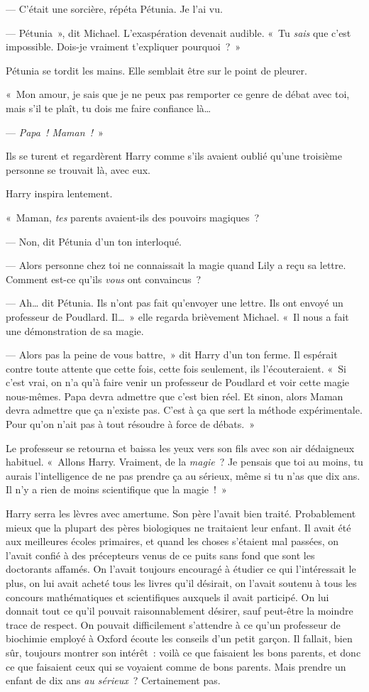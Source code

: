 --- C'était une sorcière, répéta Pétunia. Je l'ai vu.

--- Pétunia~», dit Michael. L'exaspération devenait audible. «~Tu \emph{sais} que c'est impossible. Dois-je vraiment t'expliquer pourquoi~?~»

Pétunia se tordit les mains. Elle semblait être sur le point de pleurer.

«~Mon amour, je sais que je ne peux pas remporter ce genre de débat avec toi, mais s'il te plaît, tu dois me faire confiance là…

--- \emph{Papa~! Maman~!}~»

Ils se turent et regardèrent Harry comme s'ils avaient oublié qu'une troisième personne se trouvait là, avec eux.

Harry inspira lentement.

«~Maman, \emph{tes} parents avaient-ils des pouvoirs magiques~?

--- Non, dit Pétunia d'un ton interloqué.

--- Alors personne chez toi ne connaissait la magie quand Lily a reçu sa lettre. Comment est-ce qu'ils \emph{vous} ont convaincus~?

--- Ah… dit Pétunia. Ils n'ont pas fait qu'envoyer une lettre. Ils ont envoyé un professeur de Poudlard. Il…~» elle regarda brièvement Michael. «~Il nous a fait une démonstration de sa magie.

--- Alors pas la peine de vous battre,~» dit Harry d'un ton ferme. Il espérait contre toute attente que cette fois, cette fois seulement, ils l'écouteraient. «~Si c'est vrai, on n'a qu'à faire venir un professeur de Poudlard et voir cette magie nous-mêmes. Papa devra admettre que c'est bien réel. Et sinon, alors Maman devra admettre que ça n'existe pas. C'est à ça que sert la méthode expérimentale. Pour qu'on n'ait pas à tout résoudre à force de débats.~»

Le professeur se retourna et baissa les yeux vers son fils avec son air dédaigneux habituel. «~Allons Harry. Vraiment, de la \emph{magie}~? Je pensais que toi au moins, tu aurais l'intelligence de ne pas prendre ça au sérieux, même si tu n'as que dix ans. Il n'y a rien de moins scientifique que la magie~!~»

Harry serra les lèvres avec amertume. Son père l'avait bien traité. Probablement mieux que la plupart des pères biologiques ne traitaient leur enfant. Il avait été aux meilleures écoles primaires, et quand les choses s'étaient mal passées, on l'avait confié à des précepteurs venus de ce puits sans fond que sont les doctorants affamés. On l'avait toujours encouragé à étudier ce qui l'intéressait le plus, on lui avait acheté tous les livres qu'il désirait, on l'avait soutenu à tous les concours mathématiques et scientifiques auxquels il avait participé. On lui donnait tout ce qu'il pouvait raisonnablement désirer, sauf peut-être la moindre trace de respect. On pouvait difficilement s'attendre à ce qu'un professeur de biochimie employé à Oxford écoute les conseils d'un petit garçon. Il fallait, bien sûr, toujours montrer son intérêt~: voilà ce que faisaient les bons parents, et donc ce que faisaient ceux qui se voyaient comme de bons parents. Mais prendre un enfant de dix ans \emph{au sérieux}~? Certainement pas.

